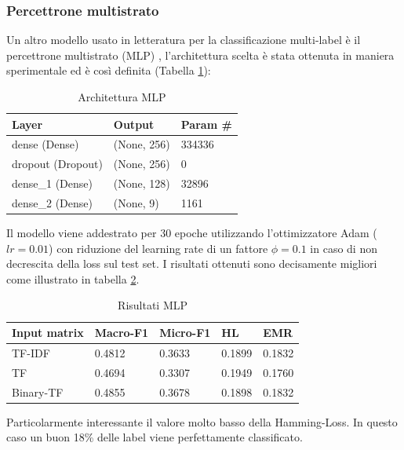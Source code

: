 \documentclass[technote]{IEEEtran}
\begin{document}
\subsubsection{Percettrone multistrato}
Un altro modello usato in letteratura per la classificazione multi-label
è il percettrone multistrato (MLP) \cite{Rosenblatt1963PRINCIPLESON},
l'architettura scelta è stata ottenuta in maniera sperimentale
ed è così definita (Tabella \ref{t_mlp_arch}):
\begin{table}[H]
\centering
\caption{Architettura MLP}
\begin{tabular}{|l|l|l|}
\hline
\textbf{Layer} & \textbf{Output} & \textbf{Param \#} \\ \hline
dense (Dense)         & (None, 256)           & 334336            \\ \hline
dropout (Dropout)     & (None, 256)           & 0                 \\ \hline
dense\_1 (Dense)      & (None, 128)           & 32896             \\ \hline
dense\_2 (Dense)      & (None, 9)             & 1161              \\ \hline
\end{tabular}
\label{t_mlp_arch}
\end{table}
Il modello viene addestrato per 30 epoche utilizzando
l'ottimizzatore Adam ($ lr = 0.01 $) con riduzione del learning rate di un
fattore $ \phi = 0.1 $ in caso di non decrescita della loss sul test set.
I risultati ottenuti sono decisamente migliori come illustrato in tabella \ref{t_res_mlp}.
\begin{table}[H]
\centering
\caption{Risultati MLP}
\begin{tabular}{|l|l|l|l|l|}
\hline
\textbf{Input matrix} & \textbf{Macro-F1} & \textbf{Micro-F1} & \textbf{HL} & \textbf{EMR} \\ \hline
TF-IDF                & 0.4812            & 0.3633            & 0.1899      & 0.1832       \\ \hline
TF                    & 0.4694            & 0.3307            & 0.1949      & 0.1760       \\ \hline
Binary-TF             & 0.4855            & 0.3678            & 0.1898      & 0.1832       \\ \hline
\end{tabular}
\label{t_res_mlp}
\end{table}
Particolarmente interessante il valore molto basso della Hamming-Loss.
In questo caso un buon 18\% delle label viene perfettamente classificato.
\end{document}
